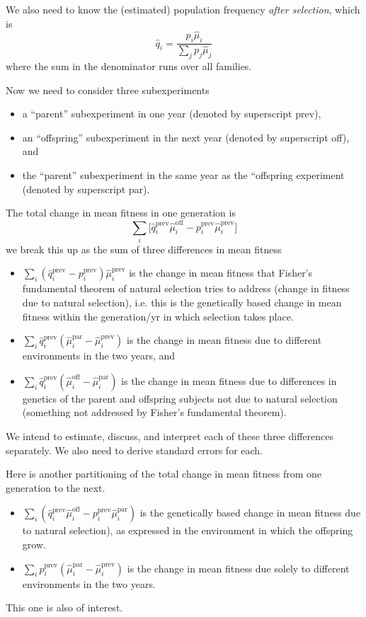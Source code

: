 \documentclass[11pt]{article}
\begin{document}
We also need to know the (estimated) population frequency
\emph{after selection}, which is
$$
   \hat{q}_i = \frac{p_i \hat{\mu}_i}{\sum_j p_j \hat{\mu}_j}
$$
where the sum in the denominator runs over all families.

Now we need to consider three subexperiments
\begin{itemize}
\item a ``parent'' subexperiment in one year (denoted by superscript prev),
\item an ``offspring'' subexperiment in the next year (denoted
    by superscript off), and
\item the ``parent'' subexperiment in the same year as the ``offspring
    experiment (denoted by superscript par).
\end{itemize}

The total change in mean fitness in one generation is
$$
   \textstyle \sum_i \bigl[
   \hat{q}_i^\text{prev} \hat{\mu}_i^\text{off}
   -
   p_i^\text{prev} \hat{\mu}_i^\text{prev}
   \bigr]
$$
we break this up as the sum of three differences in mean fitness
\begin{itemize}
\item $\sum_i (\hat{q}_i^\text{prev} - p_i^\text{prev}) \hat{\mu}_i^\text{prev}$
    is the change in mean fitness that Fisher's fundamental theorem of
    natural selection tries to address (change in fitness due to natural
    selection), i.e. this is the genetically based change in mean fitness within
    the generation/yr in which selection takes place.
\item $\sum_i \hat{q}_i^\text{prev} (\hat{\mu}_i^\text{par} -
    \hat{\mu}_i^\text{prev})$
    is the change in mean fitness due to different environments in the
    two years, and
\item $\sum_i \hat{q}_i^\text{prev} (\hat{\mu}_i^\text{off} -
    \hat{\mu}_i^\text{par})$
    is the change in mean fitness due to differences in genetics of the
    parent and offspring subjects not due to natural selection
    (something not addressed by Fisher's fundamental theorem).
\end{itemize}
We intend to estimate, discuss, and interpret each of these three differences
separately.  We also need to derive standard errors for each.


Here is another partitioning of the total change in mean fitness from one generation to the next.

\begin{itemize}
        \item $\sum_i (\hat{q}_i^\text{prev} \hat{\mu}_i^\text{off} -
        p_i^\text{prev} \hat{\mu}_i^\text{par})$
    is the genetically based change in mean fitness due to natural selection), as
    expressed in the environment in which the offspring grow.
\item $\sum_i {p}_i^\text{prev} (\hat{\mu}_i^\text{par} -
    \hat{\mu}_i^\text{prev})$
    is the change in mean fitness due solely to different environments in the
    two years.
\end{itemize}


This one is also of interest.
\end{document}
